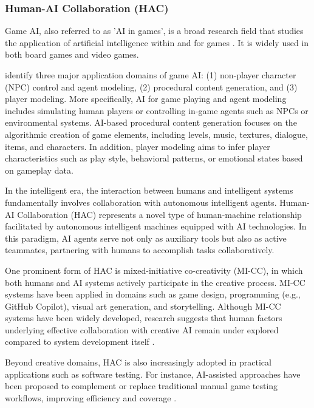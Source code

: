
\subsubsection{Human-AI Collaboration (HAC)}

Game AI, also referred to as 'AI in games', is a broad research field that studies the application of artificial intelligence within and for games \parencite{garcia-sanchez_georgios_2019}. It is widely used in both board games and video games. 

\textcite{dablander_future_2024} identify three major application domains of game AI: (1) non-player character (NPC) control and agent modeling, (2) procedural content generation, and (3) player modeling. More specifically, AI for game playing and agent modeling includes simulating human players or controlling in-game agents such as NPCs or environmental systems. AI-based procedural content generation focuses on the algorithmic creation of game elements, including levels, music, textures, dialogue, items, and characters. In addition, player modeling aims to infer player characteristics such as play style, behavioral patterns, or emotional states based on gameplay data.

In the intelligent era, the interaction between humans and intelligent systems fundamentally involves collaboration with autonomous intelligent agents. Human-AI Collaboration (HAC) represents a novel type of human-machine relationship facilitated by autonomous intelligent machines equipped with AI technologies. In this paradigm, AI agents serve not only as auxiliary tools but also as active teammates, partnering with humans to accomplish tasks collaboratively.\parencite{gao2025humancenteredhumanaicollaborationhchac}

One prominent form of HAC is mixed-initiative co-creativity (MI-CC), in which both humans and AI systems actively participate in the creative process. MI-CC systems have been applied in domains such as game design, programming (e.g., GitHub Copilot), visual art generation, and storytelling. Although MI-CC systems have been widely developed, research suggests that human factors underlying effective collaboration with creative AI remain under explored compared to system development itself \parencite{lin_beyond_2023}.

Beyond creative domains, HAC is also increasingly adopted in practical applications such as software testing. For instance, AI-assisted approaches have been proposed to complement or replace traditional manual game testing workflows, improving efficiency and coverage \parencite{zhang_human-ai_2025}.

